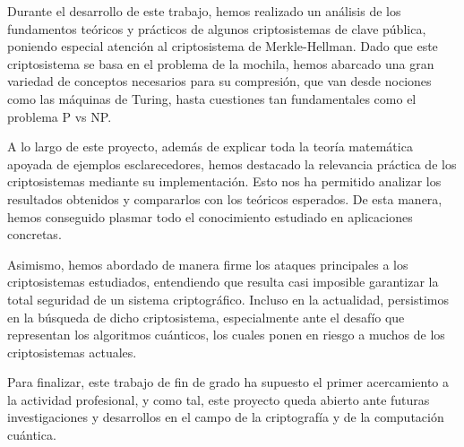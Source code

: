 
    Durante el desarrollo de este trabajo, hemos realizado un análisis de los fundamentos teóricos y prácticos de algunos criptosistemas de clave pública, poniendo especial atención al criptosistema de Merkle-Hellman. Dado que este criptosistema se basa en el problema de la mochila, hemos abarcado una gran variedad de conceptos necesarios para su compresión, que van desde nociones como las máquinas de Turing, hasta cuestiones tan fundamentales como el problema P vs NP.

    A lo largo de este proyecto, además de explicar toda la teoría matemática apoyada de ejemplos esclarecedores, hemos destacado la relevancia práctica de los criptosistemas mediante su implementación. Esto nos ha permitido analizar los resultados obtenidos y compararlos con los teóricos esperados. De esta manera, hemos conseguido plasmar todo el conocimiento estudiado en aplicaciones concretas.

    Asimismo, hemos abordado de manera firme los ataques principales a los criptosistemas estudiados, entendiendo que resulta casi imposible garantizar la total seguridad de un sistema criptográfico. Incluso en la actualidad, persistimos en la búsqueda de dicho criptosistema, especialmente ante el desafío que representan los algoritmos cuánticos, los cuales ponen en riesgo a muchos de los criptosistemas actuales.
    
    Para finalizar, este trabajo de fin de grado ha supuesto el primer acercamiento a la actividad profesional, y como tal, este proyecto queda abierto ante futuras investigaciones y desarrollos en el campo de la criptografía y de la computación cuántica.
    
\endinput
